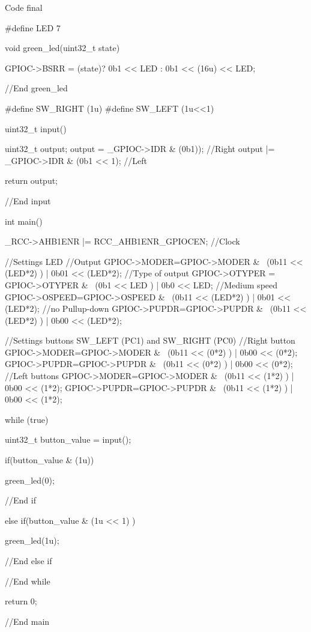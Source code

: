 \begin{Cpp}{Code final}

  #define LED 7
  
  void green_led(uint32_t state){

    GPIOC->BSRR = (state)? 0b1 << LED : 0b1 << (16u) << LED;

  }//End green_led

  #define SW_RIGHT (1u)
  #define SW_LEFT (1u<<1)

  uint32_t input(){

    uint32_t output;
    output = _GPIOC->IDR & (0b1)); //Right
    output |= _GPIOC->IDR & (0b1 << 1); //Left
  
    return output;

  }//End input

  int main(){
  
    _RCC->AHB1ENR |= RCC_AHB1ENR_GPIOCEN; //Clock

    //Settings LED
    //Output
    GPIOC->MODER=GPIOC->MODER & ~(0b11 << (LED*2) ) | 0b01 << (LED*2); 
    //Type of output
    GPIOC->OTYPER = GPIOC->OTYPER & ~(0b1 << LED ) | 0b0 << LED; 
    //Medium speed
    GPIOC->OSPEED=GPIOC->OSPEED & ~(0b11 << (LED*2) ) | 0b01 << (LED*2);
    //no Pullup-down
    GPIOC->PUPDR=GPIOC->PUPDR & ~(0b11 << (LED*2) ) | 0b00 << (LED*2);


    //Settings buttons SW_LEFT (PC1) and SW_RIGHT (PC0)
    //Right button
    GPIOC->MODER=GPIOC->MODER & ~(0b11 << (0*2) ) | 0b00 << (0*2); 
    GPIOC->PUPDR=GPIOC->PUPDR & ~(0b11 << (0*2) ) | 0b00 << (0*2);
    //Left buttons
    GPIOC->MODER=GPIOC->MODER & ~(0b11 << (1*2) ) | 0b00 << (1*2); 
    GPIOC->PUPDR=GPIOC->PUPDR & ~(0b11 << (1*2) ) | 0b00 << (1*2);
  
    while (true){
  
      uint32_t button_value = input();
  
      if(button_value & (1u)){
  
        green_led(0);
  
      }//End if
  
      else if(button_value & (1u << 1) ){
      
        green_led(1u);

      }//End else if

    }//End while

  return 0;
  }//End main

\end{Cpp}

